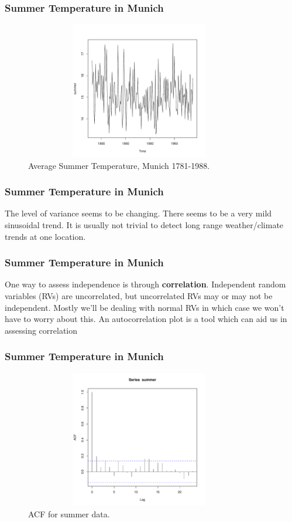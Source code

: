 \documentclass[%
xcolor=pdftex]{beamer}
\begin{document}
\begin{frame}
\frametitle{Summer Temperature in Munich}

\begin{figure} \caption{Average Summer Temperature, Munich 1781-1988.}
\begin{center}
\includegraphics[width=100mm, height=60mm]{pics/summer.pdf}
\end{center}
\label{summer}
\end{figure}

\end{frame}

\begin{frame}
\frametitle{Summer Temperature in Munich}

The level of variance seems to be changing.  There seems to be a very mild sinusoidal trend.  It is usually not trivial to detect long range weather/climate trends at one location.
\end{frame}

\begin{frame}
\frametitle{Summer Temperature in Munich}
One way to assess independence is through \textbf{correlation}.  Independent random variables (RVs) are uncorrelated, but uncorrelated RVs may or may not be independent.  Mostly we'll be dealing with normal RVs in which case we won't have to worry about this. An autocorrelation plot is a tool which can aid us in assessing correlation

\end{frame}

\begin{frame}
\frametitle{Summer Temperature in Munich}

\begin{figure} \caption{ACF for summer data.}
\begin{center}
\includegraphics[width=100mm, height=60mm]{pics/summeracf.pdf}
\end{center}
\end{figure}

\end{frame}
\end{document}
